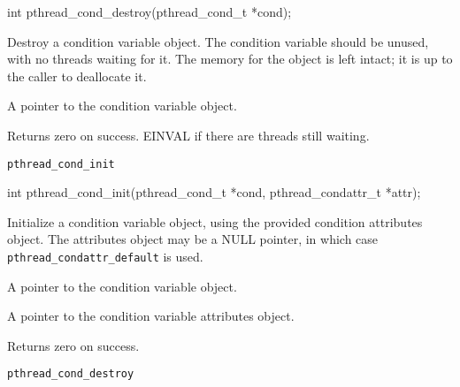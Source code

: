 \begin{apisyn}

	\funcproto int pthread_cond_destroy(pthread_cond_t *cond);
\end{apisyn}
\begin{apidesc}
	Destroy a condition variable object. The condition variable should
	be unused, with no threads waiting for it. The memory for the
	object is left intact; it is up to the caller to deallocate it.
\end{apidesc}
\begin{apiparm}
	\item[cond]
		A pointer to the condition variable object.
\end{apiparm}
\begin{apiret}
	Returns zero on success. EINVAL if there are threads still waiting.
\end{apiret}
\begin{apirel}
	{\tt pthread_cond_init}
\end{apirel}


\begin{apisyn}

	\funcproto int pthread_cond_init(pthread_cond_t *cond,
                                         pthread_condattr_t *attr);
\end{apisyn}
\begin{apidesc}
	Initialize a condition variable object, using the provided
	condition attributes object. The attributes object may be a NULL
	pointer, in which case {\tt pthread_condattr_default} is used.
\end{apidesc}
\begin{apiparm}
	\item[cond]
		A pointer to the condition variable object.
	\item[attr]
		A pointer to the condition variable attributes object.
\end{apiparm}
\begin{apiret}
	Returns zero on success.
\end{apiret}
\begin{apirel}
	{\tt pthread_cond_destroy}
\end{apirel}


